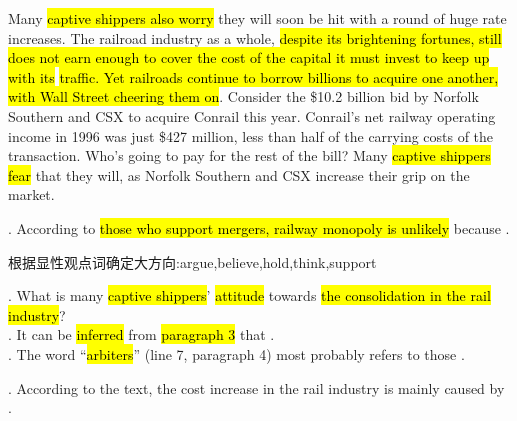 Many \hl{captive shippers also worry} they will soon be hit with a round of huge rate increases. The railroad industry as a whole, 
\hl{despite its brightening fortunes, still does not earn enough to cover the cost of the capital it must invest to keep up with its} 
\hl{traffic. Yet railroads continue to borrow billions to acquire one another, with Wall Street cheering them on}. Consider the \$10.2 billion bid by Norfolk Southern and CSX to acquire Conrail this year. Conrail’s net railway operating income in 1996 was just \$427 million, less than half of the carrying costs of the transaction. Who’s going to pay for the rest of the bill? Many \hl{captive shippers fear} that they will, as Norfolk Southern and CSX increase their grip on the market.

\begin{questions} 
.	According to \hl{those who support mergers, railway monopoly is unlikely} because \ltk{}.\\
\begin{solution}
    根据显性观点词确定大方向:argue,believe,hold,think,support
\end{solution}  

.	What is many \hl{captive shippers}’ \hl{attitude} towards \hl{the consolidation in the rail industry}?\\
.	It can be \hl{inferred} from \hl{paragraph 3} that \ltk{}.\\
.	The word “\hl{arbiters}” (line 7, paragraph 4) most probably refers to those \ltk{}.\\

.	According to the text, the cost increase in the rail industry is mainly caused by \ltk{}.\\
\end{questions}

